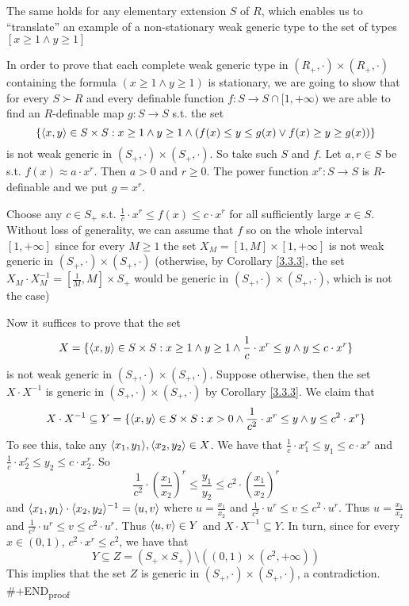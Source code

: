 \documentclass[11pt]{article}
\begin{document}
The same holds for any elementary extension \(S\) of \(R\), which enables us to ``translate'' an
example of a non-stationary weak generic type to the set of types \([x\ge 1\wedge y\ge 1]\)

In order to prove that each complete weak generic type in \((R_+,\cdot)\times(R_+,\cdot)\) containing the
formula \((x\ge 1\wedge y\ge 1)\) is stationary, we are going to show that for every \(S\succ R\) and every
definable function \(f:S\to S\cap[1,+\infty)\) we are able to find an \(R\)-definable map \(g:S\to S\) s.t.
the set
\begin{equation*}
\{\langle x,y\rangle\in S\times S:x\ge 1\wedge y\ge 1\wedge(f(x)\le y\le g(x)\vee f(x)\ge y\ge g(x))\}
\end{equation*}
is not weak generic in \((S_+,\cdot)\times(S_+,\cdot)\). So take such \(S\) and \(f\). Let \(a,r\in S\) be
s.t. \(f(x)\approx a\cdot x^r\). Then \(a>0\) and \(r\ge 0\). The power function \(x^r:S\to S\)
is \(R\)-definable and we put \(g=x^r\).

Choose any \(c\in S_+\) s.t. \(\frac{1}{c}\cdot x^r\le f(x)\le c\cdot x^r\) for all sufficiently large \(x\in S\).
Without loss of generality, we can assume that \(f\) so on the whole interval \([1,+\infty]\) since
for every \(M\ge 1\) the set \(X_M=[1,M]\times[1,+\infty]\) is not weak generic in \((S_+,\cdot)\times(S_+,\cdot)\)
(otherwise, by Corollary \ref{3.3.3}, the set \(X_M\cdot X^{-1}_M=[\frac{1}{M},M]\times S_+\) would be
generic in \((S_+,\cdot)\times(S_+,\cdot)\), which is not the case)

Now it suffices to prove that the set
\begin{equation*}
X=\{\langle x,y\rangle\in S\times S:x\ge 1\wedge y\ge 1\wedge\frac{1}{c}\cdot x^r\le y\wedge y\le c\cdot x^r\}
\end{equation*}
is not weak generic in \((S_+,\cdot)\times(S_+,\cdot)\). Suppose otherwise, then the set \(X\cdot X^{-1}\) is
generic in \((S_+,\cdot)\times(S_+,\cdot)\) by Corollary \ref{3.3.3}. We claim that
\begin{equation*}
X\cdot X^{-1}\subseteq Y=\{\langle x,y\rangle\in S\times S:x>0\wedge\frac{1}{c^2}\cdot x^r\le y\wedge y\le c^2\cdot x^r\}
\end{equation*}
To see this, take any \(\langle x_1,y_1\rangle,\langle x_2,y_2\rangle\in X\). We have that \(\frac{1}{c}\cdot x_1^r\le y_1\le c\cdot x^r\)
and \(\frac{1}{c}\cdot x_2^r\le y_2\le c\cdot x_2^r\). So
\begin{equation*}
\frac{1}{c^2}\cdot\left(\frac{x_1}{x_2}\right)^r\le\frac{y_1}{y_2}\le c^2\cdot\left( \frac{x_1}{x_2} \right)^r
\end{equation*}
and \(\langle x_1,y_1\rangle\cdot\langle x_2,y_2\rangle^{-1}=\langle u,v\rangle\) where \(u=\frac{x_1}{x_2}\)
and \(\frac{1}{c^2}\cdot u^r\le v\le c^2\cdot u^r\). Thus \(u=\frac{x_1}{x_2}\)
and \(\frac{1}{c^2}\cdot u^r\le v\le c^2\cdot u^r\). Thus \(\langle u,v\rangle\in Y\) and \(X\cdot X^{-1}\subseteq Y\). In turn, since for
every \(x\in(0,1)\), \(c^2\cdot x^r\le c^2\), we have that
\begin{equation*}
Y\subseteq Z=(S_+\times S_+)\setminus((0,1)\times (c^2,+\infty))
\end{equation*}
This implies that the set \(Z\) is generic in \((S_+,\cdot)\times(S_+,\cdot)\), a contradiction.
\#+END\textsubscript{proof}
\end{document}
